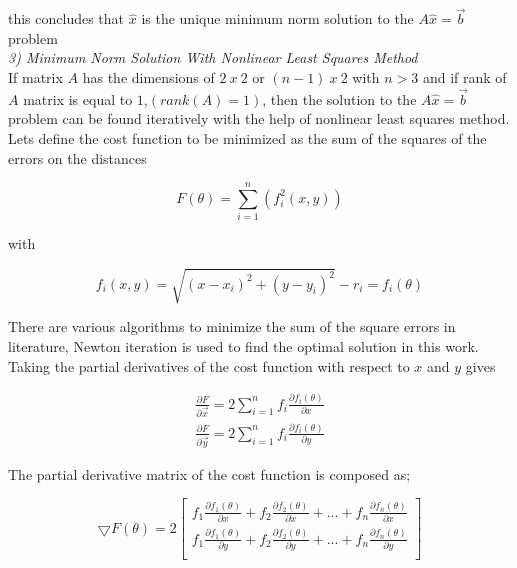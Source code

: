 this concludes that $\hat{x}$ is the unique minimum norm solution to the $A\hat{x} = \vec{b}$ problem\\
	
	
\textit{3) Minimum Norm Solution With Nonlinear Least Squares Method}\\	
If matrix $A$ has the dimensions of $2\ x\ 2$ or $(n-1)\ x\ 2$ with $n>3$ and if rank of $A$ matrix is equal to $1$,$(rank(A) = 1)$, then the solution to the $A\hat{x} = \vec{b}$ problem can be found iteratively with the help of nonlinear least squares method. Lets define the cost function to be minimized 	as the sum of the squares of the errors on the distances
	
\begin{equation}
F(\theta) = \sum_{i=1}^{n} \left(f_i^2(x,y)\right)
\end{equation}
	
with
	
\begin{equation}
f_i(x,y) = \sqrt{(x-x_i)^2 + (y - y_i)^2} - r_i = f_i(\theta) 
\end{equation}

There are various algorithms to minimize the sum of the square errors in literature, Newton iteration is used to find the optimal solution in this work.  Taking the partial derivatives of the cost function with respect to $x$ and $y$ gives 

\begin{align*}
\frac{\partial{F}}{\partial{\vec{x}}} = 2\sum_{i=1}^{n}f_i\frac{\partial{f_i(\theta)}}{\partial{x}} \\
\frac{\partial{F}}{\partial{\vec{y}}} = 2\sum_{i=1}^{n}f_i\frac{\partial{f_i(\theta)}}{\partial{y}}
\end{align*}

The partial derivative matrix of the cost function is composed as;

\begin{equation}
\bigtriangledown{F(\theta)} = 2 
\begin{bmatrix}
f_1\frac{\partial{f_1(\theta)}}{\partial{x}} + f_2\frac{\partial{f_2(\theta)}}{\partial{x}} + ... + f_n\frac{\partial{f_n(\theta)}}{\partial{x}} \\
f_1\frac{\partial{f_1(\theta)}}{\partial{y}} + f_2\frac{\partial{f_2(\theta)}}{\partial{y}} + ... + f_n\frac{\partial{f_n(\theta)}}{\partial{y}} \\
\end{bmatrix}
\end{equation}	
	
